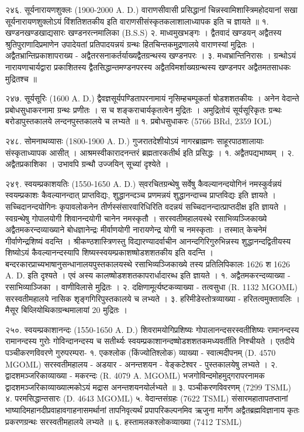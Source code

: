 २४६. सूर्यनारायणशुक्लः (1900-2000 A. D.)
वाराणसीवासी प्रसिद्धानां चिन्नस्वामिशास्त्रिमहोदयानां सखा सूर्यनारायणशुक्लोऽयं विंशतिशतकीय इति वाराणसीसंस्कृतकलाशालाध्यापक इति च ज्ञायते ॥
१. खण्डनखण्डखाद्यसारः खण्डनरत्नमालिका (B.S.S)
२. माध्वमुखभङ्गः । द्वैतवादं खण्डयन् अद्वैतस्य श्रुतिपुराणादिप्रमाणेन उपादेयतां प्रतिपादयन्नयं ग्रन्थः हितचिन्तकमुद्रणालये वाराणस्यां मुद्रितः । अद्वैतभ्रान्तिप्रकाशापराख्य - अद्वैतरसनाकर्तर्याख्यद्वैतग्रन्थस्य खण्डनपरः ।
३. मध्वभ्रान्तिनिरासः । ग्रन्थोऽयं नारायणाचार्यद्वारा प्रकाशितस्य द्वैतसिद्धान्तमण्डनपरस्य अद्वैतविमर्शाख्यग्रन्थस्य खण्डनपर अद्वैतमतसाधकः मुद्रितश्च ॥

२४७. सूर्यसूरिः (1600 A. D.)
द्वैवज्ञसूर्यपण्डितापरनामायं नृसिम्हचम्पूकर्ता षोडशशतकीयः । अनेन वेदान्ते प्रबोधसुधाकरनामा ग्रन्थः प्रणीतः । स च शङ्कराचार्यकृतत्वेन मुद्रितः । अमुद्रितोयं सूर्यसूरिकृतः ग्रन्थः बरोडापुस्तकालये लन्दनपुस्तकालये च लभ्यते ॥
१. प्रबोधसुधाकरः (5766 BRd, 2359 IOL)

२४८. सोमनाथव्यासः (1800-1900 A. D.)
गुजरातदेशीयोऽयं नागरब्राह्मणः साहूरपाठशालायाः संस्कृताध्यापक आसीत् । आश्रमस्वीकारादनन्तरं ब्रह्मतारकतीर्थ इति प्रसिद्धः ।
१. अद्वैतपद्यभाष्यम् ।
२. अद्वैतप्रकाशिका । उभावपि ग्रन्थौ उज्जयिन् सूच्यां दृश्येते ।

२४९. स्वयम्प्रकाशयतिः (1550-1650 A. D.)
स्‌वरचितग्रन्थेषु सर्वेषु कैवल्यानन्दयोगिनं नमस्कुर्वन्नयं स्वयम्प्रकाशः कैवल्यानन्दात् प्राप्तविद्यः, शुद्धानन्दञ्च प्रणमन्नयं शुद्धानन्दाच्च प्राप्तविद्यः इति ज्ञायते । सच्चिदानन्दयोगिनः कृपावलोकनेन तीर्णस्संसारवारिधिरिति वदन्नयं सच्चिदानन्दात्प्राप्तदीक्ष इति ज्ञायते ।
स्वग्रन्थेषु गोपालयोगी शिवानन्दयोगी चानेन नमस्कृतौ । सरस्वतीमहालयस्थे रसाभिव्यञ्जिकाख्ये अद्वैतमकरन्दव्याख्याने बोधज्ञानेन्द्रः मीर्वाणयोगी नारायणेन्द्र योगी च नमस्कृताः । तस्मात् केचनेमं गीर्वाणेन्द्रशिष्यं वदन्ति ।
श्रीकण्ठशास्त्रिणस्तु विद्यारण्यादर्वाचीन आनन्दगिरिगुरुभिन्नस्य शुद्धानन्दद्वितीयस्य शिष्योऽयं कैवल्यानन्दस्यापि शिष्यस्स्वयम्प्रकाशष्षोडशशतकीय इति वदन्ति ।
बन्दरकारप्राच्यभाषानुसन्धानालयपुस्तकालयस्थे रसाभिव्यञ्जिकाख्ये तस्य प्रतिलिपिकालः 1626 श 1626 A. D. इति दृश्यते । एवं अस्य कालष्षोडशशतकापरार्धादारब्ध इति ज्ञायते ।
१. अद्वैतमकरन्दव्याख्या - रसाभिव्याञ्जिका । वाणीविलासे मुद्रितः ।
२. दक्षिणामूर्त्यष्टकव्याख्या - तत्वसुधा (R. 1132 MGOML) सरस्वतीमहालये नासिक शृङ्गगिरिपुस्तकालये च लभ्यते ।
३. हरिमीडेस्तोत्रव्याख्या - हरितत्वमुक्तावलिः । मैसूर बिव्लियोथिकाग्रन्थमालायां 20 मुद्रितः ।

२५०. स्वयम्प्रकाशानन्दः (1550-1650 A. D.)
शिवरामयोगिप्रशिष्यः गोपालानन्दसरस्वतीशिष्यः रामानन्दस्य रामानन्दस्य गुरोः गोविन्दानन्दस्य च सतीर्थ्यः स्वयम्प्रकाशानन्दष्षोडशशतकमध्यवर्तीति निश्चीयते । एतदीये पञ्चीकरणविवरणे गुरुपरम्परा-
१. एकश्लोक (किंज्योतिश्लोक) व्याख्या - स्वात्मदीपनम् (D. 4570 MGOML) सरस्वतीमहालय - अडयार - अनन्तशयन - वेङ्कटेश्वर - पुस्तकालयेषु लभ्यते ।
२. द्वादशमञ्जरिकाव्याख्या - मकरन्दः (R. 4079 A. MGOML) भजगोविन्दमोहमुद्गरापरनामक द्वादशमञ्जरिकाव्याख्यात्मकोऽयं मद्रास अनन्तशयनयोर्लभ्यते ॥
३. पञ्चीकरणविवरणम् (7299 TSML)
४. परमसिद्धान्तसारः (D. 4643 MGOML)
५. वेदान्तसंग्रहः (7622 TSML) संसारमहातापतप्तानां भाष्यादिमहानदीप्रवाहावगाहनासमर्थानां तापनिवृत्यर्थं प्रपापरिकल्पनमिव ऋजुना मार्गेण अद्वैतब्रह्मविज्ञानाय कृतः प्रकरणग्रन्थः सरस्वतीमहालये लभ्यते ॥
६. हस्तामलकश्लोकव्याख्या (7412 TSML)

